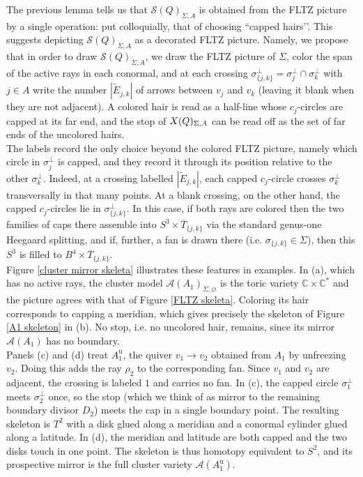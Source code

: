 \documentclass[11pt]{amsart}
\theoremstyle{definition}
\theoremstyle{remark}
\newcommand{\X}{\mathcal{X}}
\numberwithin{equation}{section}
\begin{document}
The previous lemma tells us that $\mathcal S(Q)_{\Sigma,A}$ is obtained from the FLTZ picture by a single operation: put colloquially, that of choosing ``capped hairs’’. This suggests depicting $\mathcal S(Q)_{\Sigma,A}$ as a decorated FLTZ picture. Namely, we propose that in order to draw $\mathcal S(Q)_{\Sigma,A}$, we draw the FLTZ picture of $\Sigma$, color the span of the active rays in each conormal, and at each crossing $\sigma_{\{j,k\}}^\perp=\sigma_j^\perp\cap\sigma_k^\perp$ with $j\in A$ write the number $|\tilde E_{j,k}|$ of arrows between $v_j$ and $v_k$ (leaving it blank when they are not adjacent). A colored hair is read as a half-line whose $c_j$-circles are capped at its far end, and the stop of $\mathcal \X(Q)_{\Sigma,A}$ can be read off as the set of far ends of the uncolored hairs.\\

The labels record the only choice beyond the colored FLTZ picture, namely which circle in $\sigma_j^\perp$ is capped, and they record it through its position relative to the other $\sigma_k^\perp$. Indeed, at a crossing labelled $|\tilde E_{j,k}|$, each capped $c_j$-circle crosses $\sigma_k^\perp$ transversally in that many points. At a blank crossing, on the other hand, the capped $c_j$-circles lie in $\sigma_{\{j,k\}}^\perp$. In this case, if both rays are colored then the two families of caps there assemble into $S^3\times\overline T_{\{j,k\}}$ via the standard genus-one Heegaard splitting, and if, further, a fan is drawn there (i.e. $\sigma_{\{j,k\}}\in\Sigma$), then this $S^3$ is filled to $B^4\times\overline T_{\{j,k\}}$.\\

Figure \ref{cluster mirror skeleta} illustrates these features in examples. In (a), which has no active rays, the cluster model $\mathcal A(A_1)_{\Sigma,\varnothing}$ is the toric variety $\mathbb C\times\mathbb C^*$ and the picture agrees with that of Figure \ref{FLTZ skeleta}. Coloring its hair corresponds to capping a meridian, which gives precisely the skeleton of Figure \ref{A1 skeleton} in (b). No stop, i.e. no uncolored hair, remains, since its mirror $\mathcal A(A_1)$ has no boundary.\\

Panels (c) and (d) treat $A_1^{\mathrm u}$, the quiver $v_1 \to v_2$ obtained from $A_1$ by unfreezing $v_2$. Doing this adds the ray $\rho_2$ to the corresponding fan. Since $v_1$ and $v_2$ are adjacent, the crossing is labeled $1$ and carries no fan. In (c), the capped circle $\sigma_1^\perp$ meets $\sigma_2^\perp$ once, so the stop (which we think of as mirror to the remaining boundary divisor $D_2$) meets the cap in a single boundary point. The resulting skeleton is $T^2$ with a disk glued along a meridian and a conormal cylinder glued along a latitude. In (d), the meridian and latitude are both capped and the two disks touch in one point. The skeleton is thus homotopy equivalent to $S^2$, and its prospective mirror is the full cluster variety $\mathcal{A}(A_1^{\mathrm{u}})$.\\
\end{document}
